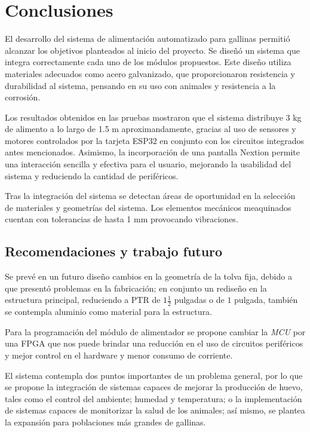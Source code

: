 
\chapter{Conclusiones}

El desarrollo del sistema de alimentación automatizado para gallinas permitió alcanzar los objetivos planteados al inicio del proyecto. Se diseñó un sistema que integra correctamente cada uno de los módulos propuestos. Este diseño utiliza materiales adecuados como acero galvanizado, que proporcionaron resistencia y durabilidad al sistema, pensando en su uso con animales y resistencia a la corrosión.

Los resultados obtenidos en las pruebas mostraron que el sistema distribuye 3 kg de alimento a lo largo de 1.5 m aproximandamente, gracias al uso de sensores y motores controlados por la tarjeta ESP32 en conjunto con los circuitos integrados antes mencionados. Asimismo, la incorporación de una pantalla Nextion permite una interacción sencilla y efectiva para el usuario, mejorando la usabilidad del sistema y reduciendo la cantidad de periféricos.

Tras la integración del sistema se detectan áreas de oportunidad en la selección de materiales y geometrías del sistema. Los elementos mecánicos meaquinados cuentan con tolerancias de hasta 1 mm provocando vibraciones. 

\section{Recomendaciones y trabajo futuro}

Se prevé en un futuro diseño cambios en la geometría de la tolva fija, debido a que presentó problemas en la fabricación; en conjunto un rediseño en la estructura principal, reduciendo a PTR de $1\frac{1}{2}$ pulgadas o de $1$ pulgada, también se contempla aluminio como material para la estructura. 

Para la programación del módulo de alimentador se propone cambiar la \textit{MCU} por una FPGA que nos puede brindar una reducción en el uso de circuitos periféricos y mejor control en el hardware y menor consumo de corriente. 


El sistema contempla dos puntos importantes de un problema general, por lo que se propone la integración de sistemas capaces de mejorar la producción de huevo, tales como el control del ambiente; humedad y temperatura; o la implementación de sistemas capaces de monitorizar la salud de los animales; así mismo, se plantea la expansión para poblaciones más grandes de gallinas.



\endinput 